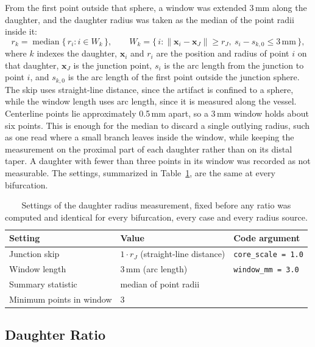 From the first point outside that sphere, a window was extended 3\,mm along the daughter, and the daughter radius was taken as the median of the point radii inside it:
\begin{equation}
  r_k = \operatorname{median}\{\, r_i : i \in W_k \,\}, \qquad
  W_k = \{\, i : \lVert \mathbf{x}_i - \mathbf{x}_J \rVert \ge r_J,\ s_i - s_{k,0} \le 3\,\mathrm{mm} \,\},
  \label{eq:daughter-ratio-window}
\end{equation}
where $k$ indexes the daughter, $\mathbf{x}_i$ and $r_i$ are the position and radius of point $i$ on that daughter, $\mathbf{x}_J$ is the junction point, $s_i$ is the arc length from the junction to point $i$, and $s_{k,0}$ is the arc length of the first point outside the junction sphere.
The skip uses straight-line distance, since the artifact is confined to a sphere, while the window length uses arc length, since it is measured along the vessel.
Centerline points lie approximately 0.5\,mm apart, so a 3\,mm window holds about six points.
This is enough for the median to discard a single outlying radius, such as one read where a small branch leaves inside the window, while keeping the measurement on the proximal part of each daughter rather than on its distal taper.
A daughter with fewer than three points in its window was recorded as not measurable.
The settings, summarized in Table~\ref{tab:daughter-ratio-settings}, are the same at every bifurcation.

\begin{table}[htbp]
  \centering
  \caption{Settings of the daughter radius measurement, fixed before any ratio was computed and identical for every bifurcation, every case and every radius source.}
  \label{tab:daughter-ratio-settings}
  \begin{tabular}{lll}
    \toprule
    Setting & Value & Code argument \\
    \midrule
    Junction skip & $1 \cdot r_J$ (straight-line distance) & \texttt{core\_scale = 1.0} \\
    Window length & 3\,mm (arc length) & \texttt{window\_mm = 3.0} \\
    Summary statistic & median of point radii & \\
    Minimum points in window & 3 & \\
    \bottomrule
  \end{tabular}
\end{table}

\subsection{Daughter Ratio}
\label{sec:daughter-ratio-definition}

